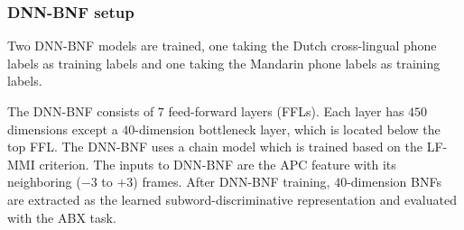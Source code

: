 \documentclass[a4paper]{article}
\begin{document}


\subsubsection{DNN-BNF setup}
Two DNN-BNF models are trained, one taking the Dutch cross-lingual phone labels as training labels and one taking the Mandarin  phone labels as training labels. %

The DNN-BNF consists of $7$ feed-forward layers (FFLs). Each layer has $450$ dimensions except a $40$-dimension bottleneck layer, which is located below the top FFL. 
The DNN-BNF uses a chain model \cite{povey2016purely} which is trained based on  the   LF-MMI criterion. 
The inputs to DNN-BNF are the APC  feature with its neighboring ($-3$ to $+3$) frames. 
After DNN-BNF training, $40$-dimension  BNFs are extracted as the learned subword-discriminative representation and evaluated with the ABX task.
\end{document}
